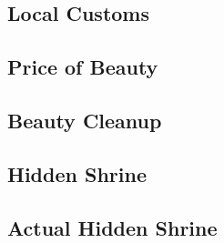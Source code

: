 

\subsection{Local Customs}


\subsection{Price of Beauty}


\subsection{Beauty Cleanup}


\subsection{Hidden Shrine}


\subsection{Actual Hidden Shrine}

